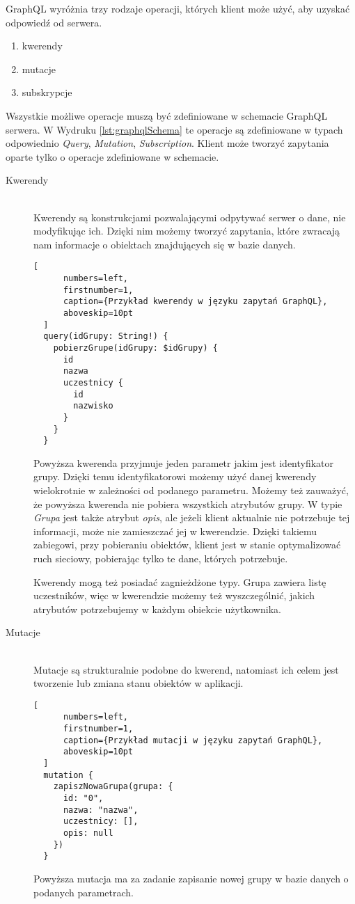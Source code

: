 GraphQL wyróżnia trzy rodzaje operacji, których klient może użyć, aby uzyskać odpowiedź od serwera.
\begin{enumerate}
  \item kwerendy
  \item mutacje
  \item subskrypcje
\end{enumerate}
Wszystkie możliwe operacje muszą być zdefiniowane w schemacie GraphQL serwera. W Wydruku \ref{lst:graphqlSchema} te operacje są zdefiniowane w typach odpowiednio \emph{Query}, \emph{Mutation}, \emph{Subscription}. Klient może tworzyć zapytania oparte tylko o operacje zdefiniowane w schemacie.

\begin{description}
  \item[Kwerendy] \hfill \\ Kwerendy są konstrukcjami pozwalającymi odpytywać serwer o dane, nie modyfikując ich. Dzięki nim możemy tworzyć zapytania, które zwracają nam informacje o obiektach znajdujących się w bazie danych.
  \begin{addmargin}[6mm]{0mm}
  \begin{lstlisting}[
      numbers=left,
      firstnumber=1,
      caption={Przykład kwerendy w języku zapytań GraphQL},
      aboveskip=10pt
  ]
  query(idGrupy: String!) {
    pobierzGrupe(idGrupy: $idGrupy) {
      id
      nazwa
      uczestnicy {
        id
        nazwisko
      }
    }
  }
  \end{lstlisting}
  \end{addmargin}

  Powyższa kwerenda przyjmuje jeden parametr jakim jest identyfikator grupy. Dzięki temu identyfikatorowi możemy użyć danej kwerendy wielokrotnie w zależności od podanego parametru. Możemy też zauważyć, że powyższa kwerenda nie pobiera wszystkich atrybutów grupy. W typie \emph{Grupa} jest także atrybut \emph{opis}, ale jeżeli klient aktualnie nie potrzebuje tej informacji, może nie zamieszczać jej w kwerendzie. Dzięki takiemu zabiegowi, przy pobieraniu obiektów, klient jest w stanie optymalizować ruch sieciowy, pobierając tylko te dane, których potrzebuje.

  Kwerendy mogą też posiadać zagnieżdżone typy. Grupa zawiera listę uczestników, więc w kwerendzie możemy też wyszczególnić, jakich atrybutów potrzebujemy w każdym obiekcie użytkownika.
  \newline
  \item[Mutacje] \hfill \\ Mutacje są strukturalnie podobne do kwerend, natomiast ich celem jest tworzenie lub zmiana stanu obiektów w aplikacji.
  \begin{addmargin}[6mm]{0mm}
  \begin{lstlisting}[
      numbers=left,
      firstnumber=1,
      caption={Przykład mutacji w języku zapytań GraphQL},
      aboveskip=10pt
  ]
  mutation {
    zapiszNowaGrupa(grupa: {
      id: "0",
      nazwa: "nazwa",
      uczestnicy: [],
      opis: null
    })
  }
  \end{lstlisting}
  \end{addmargin}
  Powyższa mutacja ma za zadanie zapisanie nowej grupy w bazie danych o podanych parametrach.


\end{description}
